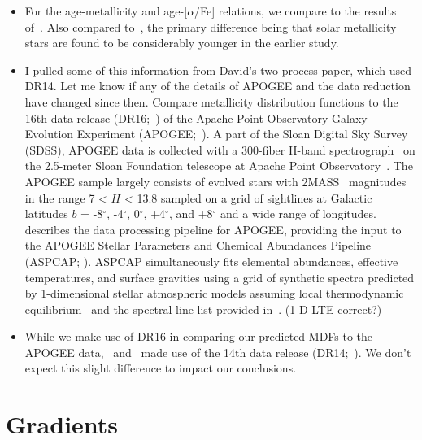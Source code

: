 \documentclass[a4paper, fleqn, usenatbib, useAMS]{mnras}
\begin{document}
\begin{itemize} 
	\item For the age-metallicity and age-[$\alpha$/Fe] relations, we compare 
	to the results of~\citet{Feuillet2019}. Also compared 
	to~\citet{Feuillet2018}, the primary difference being that solar 
	metallicity stars are found to be considerably younger in the earlier 
	study. 

	\item {\color{red} I pulled some of this information from David's 
	two-process paper, which used DR14. Let me know if any of the details of 
	APOGEE and the data reduction have changed since then. }
	Compare metallicity distribution functions to the 16th data release 
	(DR16;~\citealp{Ahumada2020}) of the Apache Point Observatory Galaxy 
	Evolution Experiment (APOGEE;~\citealp{Majewski2017}). A part of the Sloan 
	Digital Sky Survey (SDSS), APOGEE data is collected with a 300-fiber 
	H-band spectrograph~\citep{Wilson2020} on the 2.5-meter Sloan Foundation 
	telescope at Apache Point Observatory~\citep{Gunn2006}. The APOGEE sample 
	largely consists of evolved stars with 2MASS~\citep{Skrutskie2006} 
	magnitudes in the range 7 < $H$ < 13.8 sampled on a grid of sightlines 
	at Galactic latitudes $b$ = -8$^\circ$, -4$^\circ$, 0$^\circ$, +4$^\circ$, 
	and +8$^\circ$ and a wide range of longitudes. \citet{Nidever2015} 
	describes the data processing pipeline for APOGEE, providing the input to 
	the APOGEE Stellar Parameters and Chemical Abundances Pipeline (ASPCAP; 
	\citealp{Holtzman2015,GarciaPerez2016}). ASPCAP simultaneously fits 
	elemental abundances, effective temperatures, and surface gravities using a 
	grid of synthetic spectra predicted by 1-dimensional stellar atmospheric 
	models assuming local thermodynamic equilibrium~\citep{Meszaros2012, 
	Zamora2015} and the spectral line list provided in~\citep{Shetrone2015}. 
	{\color{red} (1-D LTE correct?)} 

	\item While we make use of DR16 in comparing our predicted MDFs to the 
	APOGEE data,~\citet{Feuillet2018} and~\citet{Feuillet2019} made use of the 
	14th data release (DR14;~\citealp{Abolfathi2014}). We don't expect this 
	slight difference to impact our conclusions. 
\end{itemize} 


\section{Gradients} 
\label{sec:gradients} 
\end{document}
